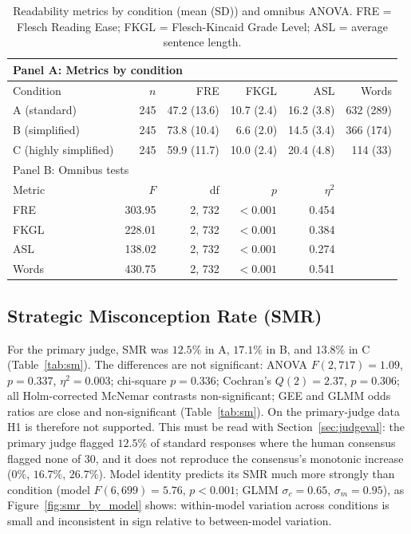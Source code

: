 \documentclass[journal,article,submit,pdftex,moreauthors]{Definitions/mdpi}
\begin{document}
\begin{table}[H]
\caption{Readability metrics by condition (mean (SD)) and omnibus ANOVA. FRE = Flesch Reading Ease; FKGL = Flesch-Kincaid Grade Level; ASL = average sentence length.}
\label{tab:readability}
\centering
\small
\begin{tabular}{lrrrrr}
\toprule
\multicolumn{6}{l}{Panel A: Metrics by condition} \\
\midrule
Condition & $n$ & FRE & FKGL & ASL & Words \\
\midrule
A (standard) & 245 & 47.2 (13.6) & 10.7 (2.4) & 16.2 (3.8) & 632 (289) \\
B (simplified) & 245 & 73.8 (10.4) & 6.6 (2.0) & 14.5 (3.4) & 366 (174) \\
C (highly simplified) & 245 & 59.9 (11.7) & 10.0 (2.4) & 20.4 (4.8) & 114 (33) \\
\midrule
\multicolumn{6}{l}{Panel B: Omnibus tests} \\
\midrule
Metric & $F$ & df & $p$ & $\eta^2$ & \\
\midrule
FRE & 303.95 & 2, 732 & $<0.001$ & 0.454 & \\
FKGL & 228.01 & 2, 732 & $<0.001$ & 0.384 & \\
ASL & 138.02 & 2, 732 & $<0.001$ & 0.274 & \\
Words & 430.75 & 2, 732 & $<0.001$ & 0.541 & \\
\bottomrule
\end{tabular}
\end{table}

\subsection{Strategic Misconception Rate (SMR)}

For the primary judge, SMR was $12.5\%$ in A, $17.1\%$ in B, and $13.8\%$ in C (Table~\ref{tab:sm}). The differences are not significant: ANOVA $F(2, 717) = 1.09$, $p = 0.337$, $\eta^2 = 0.003$; chi-square $p = 0.336$; Cochran's $Q(2) = 2.37$, $p = 0.306$; all Holm-corrected McNemar contrasts non-significant; GEE and GLMM odds ratios are close and non-significant (Table~\ref{tab:sm}). On the primary-judge data H1 is therefore not supported. This must be read with Section~\ref{sec:judgeval}: the primary judge flagged $12.5\%$ of standard responses where the human consensus flagged none of 30, and it does not reproduce the consensus's monotonic increase ($0\%$, $16.7\%$, $26.7\%$). Model identity predicts its SMR much more strongly than condition (model $F(6, 699) = 5.76$, $p < 0.001$; GLMM $\sigma_c = 0.65$, $\sigma_m = 0.95$), as Figure~\ref{fig:smr_by_model} shows: within-model variation across conditions is small and inconsistent in sign relative to between-model variation.
\end{document}
